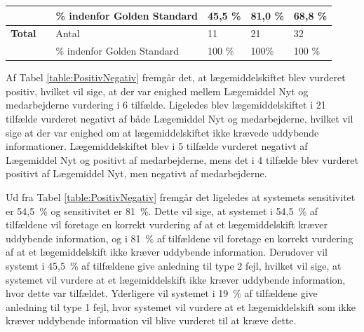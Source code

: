 \begin{table}[H]
\begin{tabular}{ll|l|l|l|l}
          \cellcolor[HTML]{C0C0C0}                                                                             &                         \cellcolor[HTML]{C0C0C0}                                                        & \% indenfor Golden Standard & 45,5 \%           & \cellcolor[HTML]{D4EED3}81,0 \%            & 68,8 \% \\ \hline
 \cellcolor[HTML]{C0C0C0}                                                                            \textbf{Total}                         &                          \cellcolor[HTML]{C0C0C0}                                                                             & Antal                     & 11               & 21               & 32     \\ \cline{3-6}
                          \cellcolor[HTML]{C0C0C0}                                                                                   &                           \cellcolor[HTML]{C0C0C0}                                                                            & \% indenfor Golden Standard & 100 \%            & 100\%            & 100 \% 
\end{tabular}
\end{table}

Af Tabel \ref{table:PositivNegativ} fremgår det, at lægemiddelskiftet blev vurderet positiv, hvilket vil sige, at der var enighed mellem Lægemiddel Nyt og medarbejderne vurdering i 6 tilfælde. Ligeledes  blev lægemiddelskiftet i 21 tilfælde vurderet negativt af både Lægemiddel Nyt og medarbejderne, hvilket vil sige at der var enighed om at lægemiddelskiftet ikke krævede uddybende informationer. Lægemiddelskiftet blev i 5 tilfælde vurderet negativt af Lægemiddel Nyt og positivt af medarbejderne, mens det i 4 tilfælde blev vurderet positivt af Lægemiddel Nyt, men negativt af medarbejderne. 

Ud fra Tabel \ref{table:PositivNegativ} fremgår det ligeledes at systemets sensitivitet er 54,5~\% og sensitivitet er 81~\%.  Dette vil sige, at systemet i 54,5~\% af tilfældene vil foretage en korrekt vurdering af at et lægemiddelskift kræver uddybende information, og i 81~\% af tilfældene vil foretage en korrekt vurdering af at et lægemiddelskift ikke kræver uddybende information. Derudover vil systemt i 45,5~\% af tilfældene give anledning til type 2 fejl, hvilket vil sige, at systemet vil vurdere at et lægemiddelskift ikke kræver uddybende information, hvor dette var tilfældet. Yderligere vil systemet i 19~\% af tilfældene give anledning til type 1 fejl, hvor systemet vil vurdere at et lægemiddelskift som ikke kræver uddybende information vil blive vurderet til at kræve dette.

